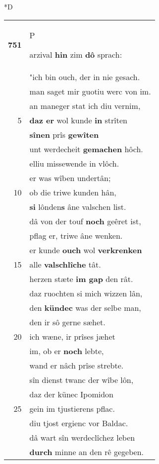 \documentclass[8pt,a4paper,notitlepage]{article}
\begin{document}
\begin{table}[ht]
\begin{minipage}[t]{0.5\linewidth}
\small
\begin{center}*D
\end{center}
\begin{tabular}{rl}
\textbf{751} & \begin{large}P\end{large}arzival \textbf{hin} zim \textbf{dô} sprach:\\ 
 & "ich bin ouch, der in nie gesach.\\ 
 & man saget mir guotiu werc von im.\\ 
 & an maneger stat ich diu vernim,\\ 
5 & \textbf{daz er} wol kunde \textbf{in} strîten\\ 
 & \textbf{sînen} prîs \textbf{gewîten}\\ 
 & unt werdecheit \textbf{gemachen} hôch.\\ 
 & elliu missewende in vlôch.\\ 
 & er was wîben undertân;\\ 
10 & ob die triwe kunden hân,\\ 
 & \textbf{si} lônden\textbf{s} âne valschen list.\\ 
 & dâ von der touf \textbf{noch} geêret ist,\\ 
 & pflag er, triwe âne wenken.\\ 
 & er kunde \textbf{ouch} wol \textbf{verkrenken}\\ 
15 & alle \textbf{valschlîche} tât.\\ 
 & herzen stæte \textbf{im gap} den rât.\\ 
 & daz ruochten si mich wizzen lân,\\ 
 & den \textbf{kündec} was der selbe man,\\ 
 & den ir sô gerne sæhet.\\ 
20 & ich wæne, ir prîses jæhet\\ 
 & im, ob er \textbf{noch} lebte,\\ 
 & wand er nâch prîse strebte.\\ 
 & sîn dienst twanc der wîbe lôn,\\ 
 & daz der künec Ipomidon\\ 
25 & gein im tjustierens pflac.\\ 
 & diu tjost ergienc vor Baldac.\\ 
 & dâ wart sîn werdeclîchez leben\\ 
 & \textbf{durch} minne an den rê gegeben.\\ 

\end{tabular}
\end{minipage}
\end{table}
\end{document}
